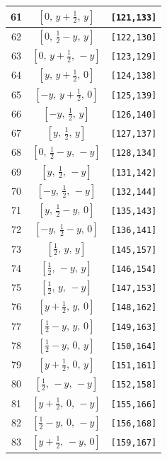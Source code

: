 \documentclass[fleqn,8pt]{jsarticle}
\begin{document}
\begin{longtable}{ccc}
61 & $\left[ 0,\, y + \frac{1}{2},\, y \right]$ & {\tt [121,133]} \\ \hline
62 & $\left[ 0,\, \frac{1}{2} - y,\, y \right]$ & {\tt [122,130]} \\ \hline
63 & $\left[ 0,\, y + \frac{1}{2},\, - y \right]$ & {\tt [123,129]} \\ \hline
64 & $\left[ y,\, y + \frac{1}{2},\, 0 \right]$ & {\tt [124,138]} \\ \hline
65 & $\left[ - y,\, y + \frac{1}{2},\, 0 \right]$ & {\tt [125,139]} \\ \hline
66 & $\left[ - y,\, \frac{1}{2},\, y \right]$ & {\tt [126,140]} \\ \hline
67 & $\left[ y,\, \frac{1}{2},\, y \right]$ & {\tt [127,137]} \\ \hline
68 & $\left[ 0,\, \frac{1}{2} - y,\, - y \right]$ & {\tt [128,134]} \\ \hline
69 & $\left[ y,\, \frac{1}{2},\, - y \right]$ & {\tt [131,142]} \\ \hline
70 & $\left[ - y,\, \frac{1}{2},\, - y \right]$ & {\tt [132,144]} \\ \hline
71 & $\left[ y,\, \frac{1}{2} - y,\, 0 \right]$ & {\tt [135,143]} \\ \hline
72 & $\left[ - y,\, \frac{1}{2} - y,\, 0 \right]$ & {\tt [136,141]} \\ \hline
73 & $\left[ \frac{1}{2},\, y,\, y \right]$ & {\tt [145,157]} \\ \hline
74 & $\left[ \frac{1}{2},\, - y,\, y \right]$ & {\tt [146,154]} \\ \hline
75 & $\left[ \frac{1}{2},\, y,\, - y \right]$ & {\tt [147,153]} \\ \hline
76 & $\left[ y + \frac{1}{2},\, y,\, 0 \right]$ & {\tt [148,162]} \\ \hline
77 & $\left[ \frac{1}{2} - y,\, y,\, 0 \right]$ & {\tt [149,163]} \\ \hline
78 & $\left[ \frac{1}{2} - y,\, 0,\, y \right]$ & {\tt [150,164]} \\ \hline
79 & $\left[ y + \frac{1}{2},\, 0,\, y \right]$ & {\tt [151,161]} \\ \hline
80 & $\left[ \frac{1}{2},\, - y,\, - y \right]$ & {\tt [152,158]} \\ \hline
81 & $\left[ y + \frac{1}{2},\, 0,\, - y \right]$ & {\tt [155,166]} \\ \hline
82 & $\left[ \frac{1}{2} - y,\, 0,\, - y \right]$ & {\tt [156,168]} \\ \hline
83 & $\left[ y + \frac{1}{2},\, - y,\, 0 \right]$ & {\tt [159,167]} \\ \hline

\end{longtable}
\end{document}
